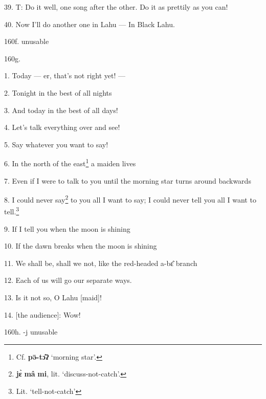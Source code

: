 39. T: Do it well, one song after the other. Do it as prettily as you can!

40. Now I'll do another one in Lahu --- In Black Lahu.

160f. unusable

160g.

1. Today --- er, that's not right yet! ---

2. Tonight in the best of all nights

3. And today in the best of all days!

4. Let's talk everything over and see!

5. Say whatever you want to say!

6. In the north of the east\footnote{Cf. \textbf{pə̄-tɔ̂ʔ} `morning star'.} a maiden lives

7. Even if I were to talk to you until the morning star turns around backwards

8. I could never say\footnote{\textbf{jɛ̀} \textbf{mâ} \textbf{mi}, lit. `discuss-not-catch'.} to you all I want to say; I could never tell you all I want
to tell.\footnote{Lit. `tell-not-catch'}

9. If I tell you when the moon is shining

10. If the dawn breaks when the moon is shining

11. We shall be, shall we not, like the red-headed a-bɛ̂ branch

12. Each of us will go our separate ways.

13. Is it not so, O Lahu [maid]!

14. [the audience]: Wow!

160h. -j unusable

